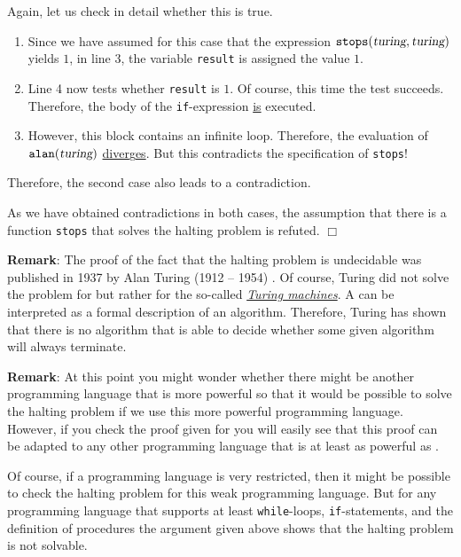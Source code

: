 \begin{enumerate}
      Again, let us check in detail whether this is true.  
      \begin{enumerate}
      \item Since we have assumed for this case that the expression 
            $\mathtt{stops}(\textsl{turing}, \textsl{turing})$ yields $1$, 
            in line 3, the variable \texttt{result} is assigned the value $1$. 
      \item Line 4 now tests whether \texttt{result} is $1$.  Of course,
            this time the test succeeds.  
            Therefore, the body of the \texttt{if}-expression \underline{is} executed.
      \item However, this block contains an infinite loop.  Therefore, the
            evaluation of $\mathtt{alan}(\textsl{turing})$ \underline{diver}g\underline{es}.
            But this contradicts the specification of \texttt{stops}!
      \end{enumerate}   
      Therefore, the second case also leads to a contradiction.
\end{enumerate}
As we have obtained contradictions in both cases, the assumption that there is a function
\texttt{stops} that solves the halting problem is refuted.
\hspace*{\fill} $\Box$
\vspace*{0.3cm}

\noindent
\textbf{Remark}:
The proof of the fact that the halting problem is undecidable was published in 1937 by Alan Turing (1912 -- 1954)
\cite{turing:1937}.  Of course, Turing did not solve the problem for \Fsharp{} but rather
for the so-called 
\href{https://en.wikipedia.org/wiki/Turing_machine}{\emph{Turing machines}}.  
A   
can be interpreted as a formal description of an algorithm.  
Therefore, Turing has shown that there is no algorithm that is able to decide whether some given
algorithm will always terminate.
\vspace*{0.3cm}

\noindent
\textbf{Remark}:
At this point you might wonder whether there might be another programming language
that is more powerful so that it would be possible to solve the halting problem if we use this more powerful
programming language.  However, if you check the proof given for \Fsharp{} you will easily
see that this proof can be adapted to any other programming language that is at least as powerful as
\Fsharp. \eox

Of course, if a programming language is very restricted, then it might be possible to check the
halting problem for this weak programming language.  But for any programming language that supports
at least \texttt{while}-loops, \texttt{if}-statements, and the definition of procedures the argument
given above shows that the halting problem is not solvable.

